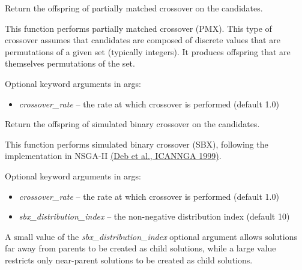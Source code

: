 \documentclass[letterpaper,10pt,english]{sphinxmanual}
\begin{document}

\begin{fulllineitems}
\label{reference:inspyred.ec.variators.partially_matched_crossover}
Return the offspring of partially matched crossover on the candidates.

This function performs partially matched crossover (PMX). This type of
crossover assumes that candidates are composed of discrete values that
are permutations of a given set (typically integers). It produces offspring
that are themselves permutations of the set.

Optional keyword arguments in args:
\begin{itemize}
\item {} 
\emph{crossover\_rate} -- the rate at which crossover is performed 
(default 1.0)

\end{itemize}

\end{fulllineitems}


\begin{fulllineitems}
\label{reference:inspyred.ec.variators.simulated_binary_crossover}
Return the offspring of simulated binary crossover on the candidates.

This function performs simulated binary crossover (SBX), following the 
implementation in NSGA-II 
\href{http://vision.ucsd.edu/~sagarwal/icannga.pdf}{(Deb et al., ICANNGA 1999)}.

Optional keyword arguments in args:
\begin{itemize}
\item {} 
\emph{crossover\_rate} -- the rate at which crossover is performed 
(default 1.0)

\item {} 
\emph{sbx\_distribution\_index} -- the non-negative distribution index 
(default 10)

\end{itemize}

A small value of the \emph{sbx\_distribution\_index} optional argument allows 
solutions far away from parents to be created as child solutions, 
while a large value restricts only near-parent solutions to be created as
child solutions.

\end{fulllineitems}
\end{document}
